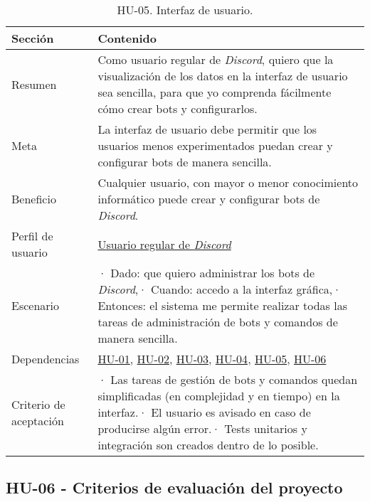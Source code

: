 \begin{table}[H]
    \centering
    \def\arraystretch{1.25}
    \begin{adjustbox}{max width=\textwidth}
    \begin{tabularx}{\textwidth}{|l|L|}
    \hline
        \textbf{Sección} & \textbf{Contenido} \\ \hline
    \hline
        Resumen & Como usuario regular de \textit{Discord}, quiero que la visualización de los datos en la interfaz de usuario sea sencilla, para que yo comprenda fácilmente cómo crear bots y configurarlos. \\ \hline
        Meta & La interfaz de usuario debe permitir que los usuarios menos experimentados puedan crear y configurar bots de manera sencilla. \\ \hline
        Beneficio & Cualquier usuario, con mayor o menor conocimiento informático puede crear y configurar bots de \textit{Discord}. \\ \hline
        Perfil de usuario & \hyperref[sec:personaUsuarioDiscord]{Usuario regular de \textit{Discord}} \\ \hline
        Escenario & · Dado: que quiero administrar los bots de \textit{Discord},\linebreak · Cuando: accedo a la interfaz gráfica,\linebreak · Entonces: el sistema me permite realizar todas las tareas de administración de bots y comandos de manera sencilla. \\ \hline
        Dependencias & \hyperref[sec:hu01]{HU-01}, \hyperref[sec:hu02]{HU-02}, \hyperref[sec:hu03]{HU-03}, \hyperref[sec:hu04]{HU-04}, \hyperref[sec:hu05]{HU-05}, \hyperref[sec:hu06]{HU-06} \\ \hline
        Criterio de aceptación & · Las tareas de gestión de bots y comandos quedan simplificadas (en complejidad y en tiempo) en la interfaz.\linebreak · El usuario es avisado en caso de producirse algún error.\linebreak · Tests unitarios y integración son creados dentro de lo posible. \\ \hline
    \end{tabularx}
    \end{adjustbox}
    \caption{HU-05. Interfaz de usuario.}
\end{table}

\subsection{HU-06 - Criterios de evaluación del proyecto}
\label{sec:hu06}

